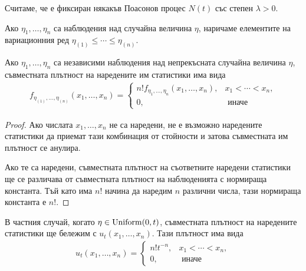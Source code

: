 \documentclass[numbers=endperiod, bibliography=totocnumbered]{scrartcl}
\begin{document}
Считаме, че е фиксиран някакъв Поасонов процес \( N(t) \) със степен \( \lambda > 0 \).

\begin{definition}
  Ако \( \eta_1, \ldots, \eta_n \) са наблюдения над случайна величина \( \eta \),  наричаме елементите на вариационния ред \( \eta_{(1)} \leq \cdots \leq \eta_{(n)} \).
\end{definition}

\begin{proposition}
  Ако \( \eta_1, \ldots, \eta_n \) са независими наблюдения над непрекъсната случайна величина \( \eta \), съвместната плътност на наредените им статистики има вида
  \begin{align*}
    f_{\eta_{(1)}, \ldots, \eta_{(n)}} (x_1, \ldots, x_n)
    =
    \begin{cases}
      n! f_{\eta_{1}, \ldots, \eta_{n}} (x_1, \ldots, x_n), &x_1 < \cdots < x_n, \\
      0, &\text{ иначе}
    \end{cases}
  \end{align*}
\end{proposition}
\begin{proof}
  Ако числата \( x_1, \ldots, x_n \) не са наредени, не е възможно наредените статистики да приемат тази комбинация от стойности и затова съвместната им плътност се анулира.

  Ако те са наредени, съвместната плътност на съответните наредени статистики ще се различава от съвместната плътност на наблюденията с нормираща константа. Тъй като има \( n \)! начина да наредим \( n \) различни числа, тази нормираща константа е \( n \)!.
\end{proof}

\begin{note}
  В частния случай, когато \( \eta \in \operatorname{Uniform}(0, t) \), съвместната плътност на наредените статистики ще бележим с \( u_t(x_1, \ldots, x_n) \). Тази плътност има вида
  \begin{align*}
    u_t(x_1, \ldots, x_n)
    =
    \begin{cases}
      n! t^{-n}, &x_1 < \cdots < x_n, \\
      0, &\text{ иначе}
    \end{cases}
  \end{align*}
\end{note}
\end{document}
